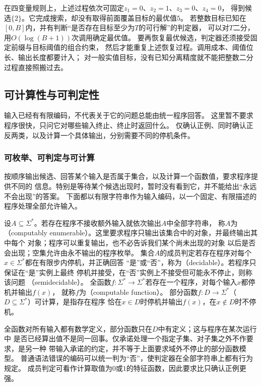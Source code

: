 在四变量规则上，上述过程依次可固定$z_1=0$、$z_2=1$、$z_3=0$、$z_4=0$，
得到候选$\{2\}$。它完成搜索，却没有取得前面覆盖目标的最优值$5$。
若整数目标已知在$[0,B]$内，并有判断“是否存在目标至少为$T$的可行解”的判定器，
可以对$T$二分，用$O(\log(B+1))$次调用确定最优值。
要再恢复最优候选，判定器还须接受固定前缀与目标阈值的组合约束，
然后才能重复上述恢复过程。调用成本、阈值位长、输出长度都要计入；
对一般实值目标，没有已知分离精度就不能把整数二分过程直接照搬过去。

\subsection{可计算性与可判定性}
\label{sec:comb-computability}

输入已经有有限编码，不代表关于它的问题总能由统一程序回答。
这里暂不要求程序很快，只问它对哪些输入终止、终止时返回什么。
仅确认正例、同时确认正反两类，以及计算一个具体输出，分别需要不同的停机条件。

\subsubsection{可枚举、可判定与可计算}
\label{sec:comb-enumeration-decision}

按顺序输出候选、回答某个输入是否属于集合，以及计算一个函数值，要求程序提供不同的
信息。特别是等待某个候选出现时，暂时没有看到它，并不能给出“永远不会出现”的答案。
下面都以有限字符串作为输入编码，以一个固定、有限描述的程序处理全部允许输入。
\begin{definition}
\label{def:comb-computability}
设$A\subseteq\Sigma^\ast$。若存在程序不接收额外输入就依次输出$A$中全部字符串，
称$A$为
（computably enumerable）。这里要求程序只输出该集合中的对象，并最终输出其中每个
对象；程序可以重复输出，也不必告诉我们某个尚未出现的对象
以后是否会出现；空集允许由永不输出的程序枚举。
集合$A$的成员判定若存在程序对每个$x\in\Sigma^\ast$都在有限步内停机，并正确回答
“是”或“否”，称为（decidable）。若程序只保证在“是”实例上最终
停机并接受，在“否”实例上不接受但可能永不停止，则称该问题
（semidecidable）。
全函数$f:\Sigma^\ast\to\Sigma^\ast$若存在一个程序，对每个输入$x$都停机并输出$f(x)$，
就称$f$为（computable function）。
部分函数$f:D\to\Sigma^\ast$（$D\subseteq\Sigma^\ast$）可计算，是指存在程序
恰在$x\in D$时停机并输出$f(x)$，在$x\notin D$时不停机。
\end{definition}
全函数对所有输入都有数学定义，部分函数只在$D$中有定义；这与程序在某次运行中
是否已经算出值不是同一回事。仅承诺处理一个指定子集、对子集之外不作要求，是另一种
带输入承诺的约定，并不等于上面要求域外不停止的部分函数模型。
普通语法错误的编码可以统一判为“否”，使判定器在全部字符串上都有行为规定。
成员判定可看作计算取值为$0$或$1$的特征函数，因此要求比只确认正例更强。

